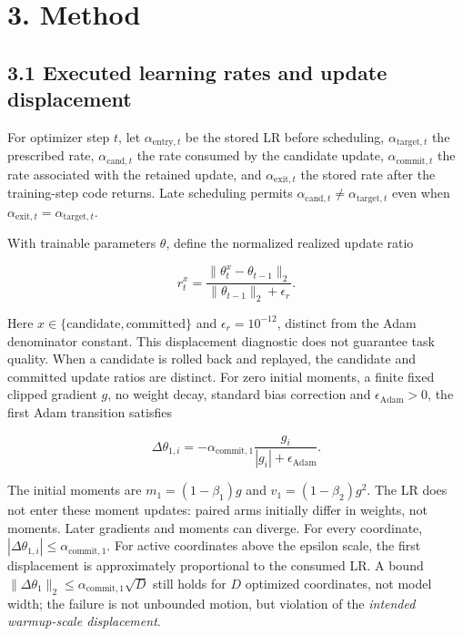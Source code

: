 \documentclass[smallextended]{svjour3}
\begin{document}
\section{3. Method}\label{method}

\subsection{3.1 Executed learning rates and update displacement}\label{executed-learning-rates-and-update-displacement}

For optimizer step \(t\), let \(\alpha_{\mathrm{entry},t}\) be the stored LR before scheduling, \(\alpha_{\mathrm{target},t}\) the prescribed rate, \(\alpha_{\mathrm{cand},t}\) the rate consumed by the candidate update, \(\alpha_{\mathrm{commit},t}\) the rate associated with the retained update, and \(\alpha_{\mathrm{exit},t}\) the stored rate after the training-step code returns. Late scheduling permits \(\alpha_{\mathrm{cand},t}\ne\alpha_{\mathrm{target},t}\) even when \(\alpha_{\mathrm{exit},t}=\alpha_{\mathrm{target},t}\).

With trainable parameters \(\theta\), define the normalized realized update ratio

\[
 r_t^{x}=\frac{\|\theta_t^{x}-\theta_{t-1}\|_2}{\|\theta_{t-1}\|_2+\epsilon_r}. \tag{1}
\]

Here \(x\in\{\mathrm{candidate},\mathrm{committed}\}\) and \(\epsilon_r=10^{-12}\), distinct from the Adam denominator constant. This displacement diagnostic does not guarantee task quality. When a candidate is rolled back and replayed, the candidate and committed update ratios are distinct. For zero initial moments, a finite fixed clipped gradient \(g\), no weight decay, standard bias correction and \(\epsilon_{\mathrm{Adam}}>0\), the first Adam transition satisfies

\[
\Delta\theta_{1,i}=-\alpha_{\mathrm{commit},1}\frac{g_i}{|g_i|+\epsilon_{\mathrm{Adam}}}. \tag{2}
\]

The initial moments are \(m_1=(1-\beta_1)g\) and \(v_1=(1-\beta_2)g^2\). The LR does not enter these moment updates: paired arms initially differ in weights, not moments. Later gradients and moments can diverge. For every coordinate, \(|\Delta\theta_{1,i}|\leq\alpha_{\mathrm{commit},1}\). For active coordinates above the epsilon scale, the first displacement is approximately proportional to the consumed LR. A bound \(\|\Delta\theta_1\|_2\le\alpha_{\mathrm{commit},1}\sqrt{D}\) still holds for \(D\) optimized coordinates, not model width; the failure is not unbounded motion, but violation of the \emph{intended warmup-scale displacement}.
\end{document}
